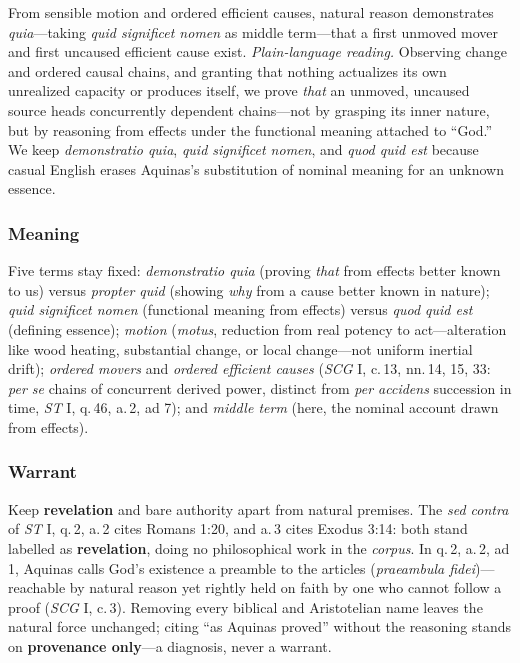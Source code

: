 From sensible motion and ordered efficient causes, natural reason demonstrates \emph{quia}---taking \emph{quid significet nomen} as middle term---that a first unmoved mover and first uncaused efficient cause exist. \emph{Plain-language reading.} Observing change and ordered causal chains, and granting that nothing actualizes its own unrealized capacity or produces itself, we prove \emph{that} an unmoved, uncaused source heads concurrently dependent chains---not by grasping its inner nature, but by reasoning from effects under the functional meaning attached to ``God.'' We keep \emph{demonstratio quia}, \emph{quid significet nomen}, and \emph{quod quid est} because casual English erases Aquinas's substitution of nominal meaning for an unknown essence.

\subsubsection*{Meaning}

Five terms stay fixed: \emph{demonstratio quia} (proving \emph{that} from effects better known to us) versus \emph{propter quid} (showing \emph{why} from a cause better known in nature); \emph{quid significet nomen} (functional meaning from effects) versus \emph{quod quid est} (defining essence); \emph{motion} (\emph{motus}, reduction from real potency to act---alteration like wood heating, substantial change, or local change---not uniform inertial drift); \emph{ordered movers} and \emph{ordered efficient causes} (\emph{SCG} I, c.\,13, nn.\,14, 15, 33: \emph{per se} chains of concurrent derived power, distinct from \emph{per accidens} succession in time, \emph{ST} I, q.\,46, a.\,2, ad 7); and \emph{middle term} (here, the nominal account drawn from effects).

\subsubsection*{Warrant}

Keep \textbf{revelation} and bare authority apart from natural premises. The \emph{sed contra} of \emph{ST} I, q.\,2, a.\,2 cites Romans 1:20, and a.\,3 cites Exodus 3:14: both stand labelled as \textbf{revelation}, doing no philosophical work in the \emph{corpus}. In q.\,2, a.\,2, ad 1, Aquinas calls God's existence a preamble to the articles (\emph{praeambula fidei})---reachable by natural reason yet rightly held on faith by one who cannot follow a proof (\emph{SCG} I, c.\,3). Removing every biblical and Aristotelian name leaves the natural force unchanged; citing ``as Aquinas proved'' without the reasoning stands on \textbf{provenance only}---a diagnosis, never a warrant.

